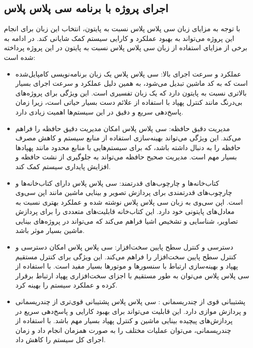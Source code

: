 \subsection{اجرای پروژه با برنامه سی پلاس پلاس}
با توجه به مزایای زبان سی پلاس پلاس نسبت به پایتون، انتخاب این زبان برای انجام این پروژه می‌تواند به بهبود عملکرد و کارایی سیستم کمک شایانی کند. در ادامه به برخی از مزایای استفاده از زبان سی پلاس پلاس نسبت به پایتون در این پروژه پرداخته شده است:

\begin{itemize}
    \item عملکرد و سرعت اجرای بالا: سی پلاس پلاس یک زبان برنامه‌نویسی کامپایل‌شده است که به کد ماشین تبدیل می‌شود، به همین دلیل عملکرد و سرعت اجرای بسیار بالاتری نسبت به پایتون دارد که یک زبان تفسیری است. این ویژگی
    برای پروژه‌های بی‌درنگ مانند کنترل پهپاد با استفاده از علائم دست بسیار حیاتی است، زیرا زمان پاسخ‌دهی سریع و دقیق در این سیستم‌ها اهمیت زیادی دارد.
    \item مدیریت دقیق حافظه: سی پلاس پلاس امکان مدیریت دقیق حافظه را فراهم می‌کند. این ویژگی می‌تواند بهینه‌سازی استفاده از منابع سیستم و کاهش مصرف حافظه را به دنبال داشته باشد، که برای سیستم‌هایی 
    با منابع محدود مانند پهپادها بسیار مهم است. مدیریت صحیح حافظه می‌تواند به جلوگیری از نشت حافظه و افزایش پایداری سیستم کمک کند.
    \item کتاب‌خانه‌ها و چارچوب‌های قدرتمند: سی پلاس پلاس دارای کتاب‌خانه‌ها و چارچوب‌های قدرتمندی برای پردازش تصویر و بینایی ماشین مانند اپن سی‌وی است. اپن سی‌وی به زبان سی پلاس پلاس نوشته شده
    و عملکرد بهتری نسبت به معادل‌های پایتونی خود دارد. این کتاب‌خانه قابلیت‌های متعددی را برای پردازش تصاویر، شناسایی و تشخیص اشیا فراهم می‌کند که می‌تواند در پروژه‌های بینایی ماشین بسیار موثر باشد.
    \item دسترسی و کنترل سطح پایین سخت‌افزار: سی پلاس پلاس امکان دسترسی و کنترل سطح پایین سخت‌افزار را فراهم می‌کند. این ویژگی برای کنترل مستقیم پهپاد و بهینه‌سازی ارتباط با سنسورها 
    و موتورها بسیار مفید است. با استفاده از سی پلاس پلاس می‌توان به طور مستقیم با اجزای سخت‌افزاری پهپاد ارتباط برقرار کرده و عملکرد سیستم را بهینه کرد.
    \item  پشتیبانی قوی از چندریسمانی : سی پلاس پلاس پشتیبانی قوی‌تری از چندریسمانی و پردازش موازی دارد. این قابلیت می‌تواند برای بهبود کارایی و پاسخ‌دهی سریع در پردازش‌های پیچیده بینایی ماشین 
    و کنترل پهپاد بسیار مهم باشد. با استفاده از چندریسمانی، می‌توان عملیات مختلف را به صورت همزمان انجام داد و زمان اجرای کل سیستم را کاهش داد.
\end{itemize}

